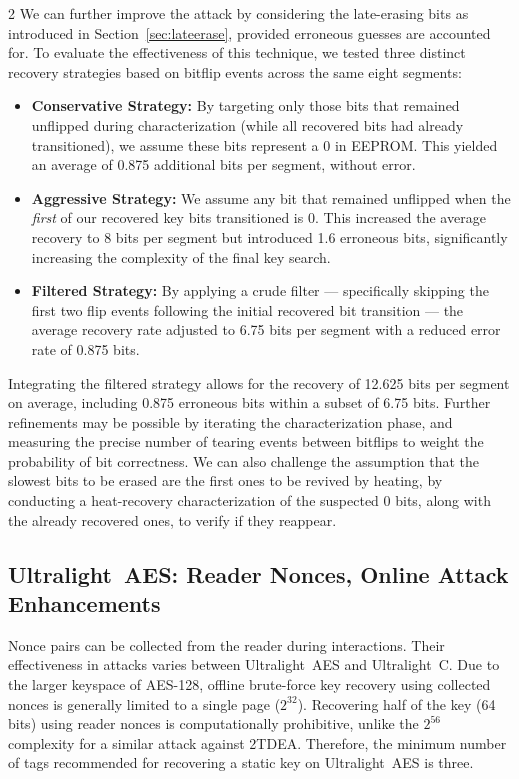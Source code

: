 \documentclass[10pt,letterpaper]{article}
\begin{document}
\begin{multicols}{2}
We can further improve the attack by considering the late-erasing bits as introduced in Section~\ref{sec:lateerase}, provided erroneous guesses are accounted for.
To evaluate the effectiveness of this technique, we tested three distinct recovery strategies based on bitflip events across the same eight segments:
\begin{itemize}
    \item \textbf{Conservative Strategy:} By targeting only those bits that remained unflipped during characterization (while all recovered bits had already transitioned), we assume these bits represent a $0$ in EEPROM. This yielded an average of 0.875 additional bits per segment, without error.
    \item \textbf{Aggressive Strategy:} We assume any bit that remained unflipped when the \emph{first} of our recovered key bits transitioned is $0$. This increased the average recovery to 8 bits per segment but introduced 1.6 erroneous bits, significantly increasing the complexity of the final key search.
    \item \textbf{Filtered Strategy:} By applying a crude filter --- specifically skipping the first two flip events following the initial recovered bit transition --- the average recovery rate adjusted to 6.75 bits per segment with a reduced error rate of 0.875 bits.
\end{itemize}
Integrating the filtered strategy allows for the recovery of 12.625 bits per segment on average, including 0.875 erroneous bits within a subset of 6.75 bits.
Further refinements may be possible by iterating the characterization phase, and measuring the precise number of tearing events between bitflips to weight the probability of bit correctness. We can also challenge the assumption that the slowest bits to be erased are the first ones to be revived by heating, by conducting a heat-recovery characterization of the suspected $0$ bits, along with the already recovered ones, to verify if they reappear.

\subsection{Ultralight~AES: Reader Nonces, Online Attack Enhancements}
\label{sec:aes_readernonce}
    
Nonce pairs can be collected from the reader during interactions. Their effectiveness in attacks varies between Ultralight~AES and Ultralight~C. Due to the larger keyspace of AES-128, offline brute-force key recovery using collected nonces is generally limited to a single page ($2^{32}$). Recovering half of the key (64 bits) using reader nonces is computationally prohibitive, unlike the $2^{56}$ complexity for a similar attack against 2TDEA. Therefore, the minimum number of tags recommended for recovering a static key on Ultralight~AES is three.


\end{multicols}
\end{document}
